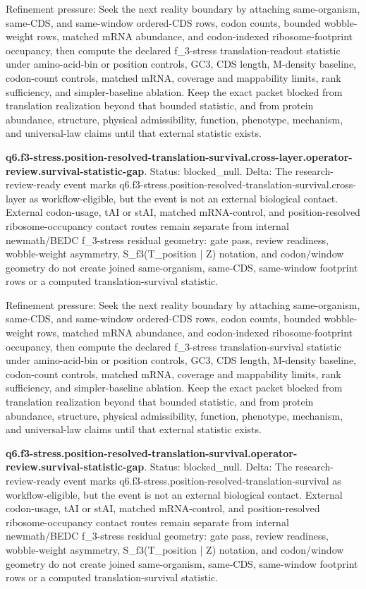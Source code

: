 Refinement pressure: Seek the next reality boundary by attaching same-organism, same-CDS, and same-window ordered-CDS rows, codon counts, bounded wobble-weight rows, matched mRNA abundance, and codon-indexed ribosome-footprint occupancy, then compute the declared f\_3-stress translation-readout statistic under amino-acid-bin or position controls, GC3, CDS length, M-density baseline, codon-count controls, matched mRNA, coverage and mappability limits, rank sufficiency, and simpler-baseline ablation. Keep the exact packet blocked from translation realization beyond that bounded statistic, and from protein abundance, structure, physical admissibility, function, phenotype, mechanism, and universal-law claims until that external statistic exists.

\textbf{q6.f3-stress.position-resolved-translation-survival.cross-layer.operator-review.survival-statistic-gap}. Status: blocked\_null. Delta: The research-review-ready event marks q6.f3-stress.position-resolved-translation-survival.cross-layer as workflow-eligible, but the event is not an external biological contact. External codon-usage, tAI or stAI, matched mRNA-control, and position-resolved ribosome-occupancy contact routes remain separate from internal newmath/BEDC f\_3-stress residual geometry: gate pass, review readiness, wobble-weight asymmetry, S\_f3(T\_position | Z) notation, and codon/window geometry do not create joined same-organism, same-CDS, same-window footprint rows or a computed translation-survival statistic.

Refinement pressure: Seek the next reality boundary by attaching same-organism, same-CDS, and same-window ordered-CDS rows, codon counts, bounded wobble-weight rows, matched mRNA abundance, and codon-indexed ribosome-footprint occupancy, then compute the declared f\_3-stress translation-survival statistic under amino-acid-bin or position controls, GC3, CDS length, M-density baseline, codon-count controls, matched mRNA, coverage and mappability limits, rank sufficiency, and simpler-baseline ablation. Keep the exact packet blocked from translation realization beyond that bounded statistic, and from protein abundance, structure, physical admissibility, function, phenotype, mechanism, and universal-law claims until that external statistic exists.

\textbf{q6.f3-stress.position-resolved-translation-survival.operator-review.survival-statistic-gap}. Status: blocked\_null. Delta: The research-review-ready event marks q6.f3-stress.position-resolved-translation-survival as workflow-eligible, but the event is not an external biological contact. External codon-usage, tAI or stAI, matched mRNA-control, and position-resolved ribosome-occupancy contact routes remain separate from internal newmath/BEDC f\_3-stress residual geometry: gate pass, review readiness, wobble-weight asymmetry, S\_f3(T\_position | Z) notation, and codon/window geometry do not create joined same-organism, same-CDS, same-window footprint rows or a computed translation-survival statistic.

